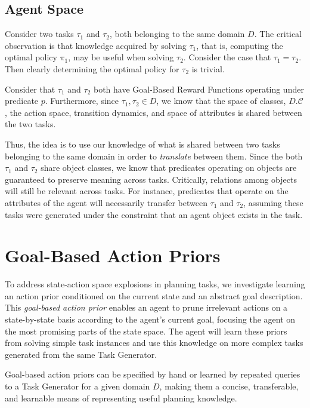 \documentclass[11pt]{article}
\begin{document}
\subsection{Agent Space}
Consider two tasks $\tau_1$ and $\tau_2$, both belonging to the same domain $D$. The critical observation is that knowledge acquired by solving $\tau_1$, that is, computing the optimal policy $\pi_1$, may be useful when solving $\tau_2$. Consider the case that $\tau_1 = \tau_2$. Then clearly determining the optimal policy for $\tau_2$ is trivial.

Consider that $\tau_1$ and $\tau_2$ both have Goal-Based Reward Functions operating under predicate $p$. Furthermore, since $\tau_1, \tau_2 \in D$, we know that the space of classes, $D.\mathcal{C}$, the action space, transition dynamics, and space of attributes is shared between the two tasks.

Thus, the idea is to use our knowledge of what is shared between two tasks belonging to the same domain in order to {\it translate} between them. Since the both $\tau_1$ and $\tau_2$ share object classes, we know that predicates operating on objects are guaranteed to preserve meaning across tasks. Critically, relations among objects will still be relevant across tasks. For instance, predicates that operate on the attributes of the agent will necessarily transfer between $\tau_1$ and $\tau_2$, assuming these tasks were generated under the constraint that an agent object exists in the task.

\section{Goal-Based Action Priors}
\label{sec:gbaps}

To address state-action space explosions in planning tasks,
we investigate learning an action prior conditioned on the current state and an abstract goal description. This {\it goal-based action prior}
enables an agent to prune irrelevant actions on a
state-by-state basis according to the agent's current goal, focusing the agent on
the most promising parts of the state space. The agent will learn these priors from solving simple task instances and use this knowledge on more complex tasks generated from the same Task Generator.
 
Goal-based action priors can be specified
by hand or learned by repeated queries to a Task Generator for a given domain $D$, making them a concise, transferable, and learnable means of
representing useful planning knowledge. 
\end{document}
